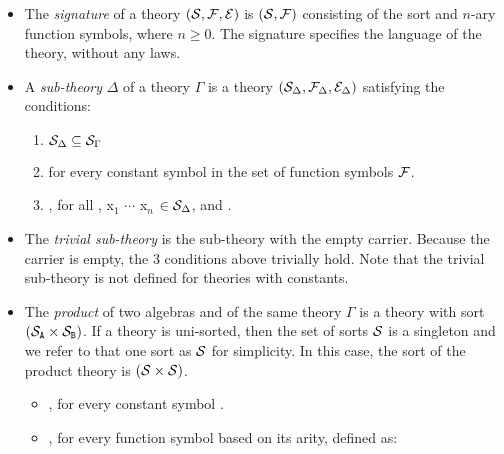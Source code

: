 \begin{itemize}
    \item The \emph{signature} of a theory $(\mathcal{S}, \mathcal{F}, \mathcal{E})$ is $(\mathcal{S}, \mathcal{F})$ consisting of the sort and $n$-ary function symbols, where $n \geq 0$. The signature specifies the language of the theory, without any laws. 
    \item A \emph{sub-theory} $\Delta$ of a theory $\Gamma$ is a theory $(\mathcal{S}_\Delta, \mathcal{F}_\Delta,\mathcal{E}_\Delta)$ satisfying the conditions:  
    \begin{enumerate}
    \item $\mathcal{S}_\Delta \subseteq \mathcal{S}_\Gamma$ 
    \item {} \lstmath{=}  \lstmath{$\in \sort_\Delta$} for every constant symbol in the set of function symbols $\mathcal{F}$. 
    \item {} \lstmath{=}  \lstmath{$\in \sort_\Delta$}, for all , {x$_1$ $\cdots$ x$_n$ $\in \sort_\Delta$}, and . 
    \end{enumerate}
    \item The \emph{trivial sub-theory} is the sub-theory with the empty carrier. Because the carrier is empty, the $3$ conditions above trivially hold. Note that the trivial sub-theory is not defined for theories with constants.    
    \item The \emph{product} of two algebras  and  of the same theory $\Gamma$ is a theory with sort $(\mathcal{S}_\texttt{A} \times \mathcal{S}_\texttt{B})$. If a theory is uni-sorted, then the set of sorts $\mathcal{S}$ is a singleton and we refer to that one sort as $\mathcal{S}$ for simplicity. In this case, the sort of the product theory is $(\mathcal{S} \times \mathcal{S})$. 
    \begin{itemize}
    \item {}, for every constant symbol 
      . 
    \item {}, for every function symbol  based on its arity, defined as: \newline 

\end{itemize}
\end{itemize}
